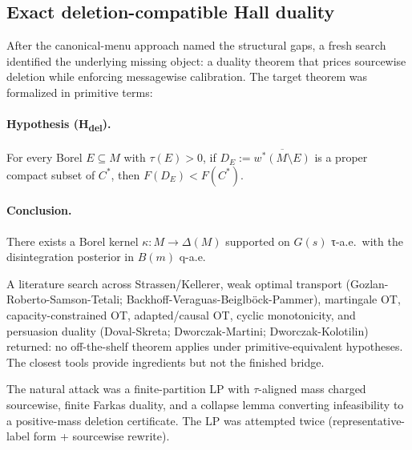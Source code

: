 \documentclass[11pt]{article}
\theoremstyle{definition}
\theoremstyle{remark}
\begin{document}
\subsection{Exact deletion-compatible Hall duality}\label{sec:exact}

After the canonical-menu approach named the structural gaps, a
fresh search identified the underlying missing object: a duality
theorem that prices sourcewise deletion while enforcing messagewise
calibration. The target theorem was formalized in primitive terms:

\paragraph{Hypothesis (H\textsubscript{del}).} For every Borel
$E\subseteq M$ with $\tau(E)>0$, if $D_E := \overline{w^*(M\setminus E)}$
is a proper compact subset of $C^*$, then $F(D_E) < F(C^*)$.

\paragraph{Conclusion.} There exists a Borel kernel $\kappa: M\to\Delta(M)$
supported on $G(s)$ τ-a.e.\ with the disintegration posterior in
$B(m)$ q-a.e.

A literature search across Strassen/Kellerer, weak optimal
transport (Gozlan-Roberto-Samson-Tetali; Backhoff-Veraguas-Beigl\-böck-Pammer),
martingale OT, capacity-constrained OT, adapted/causal OT, cyclic
monotonicity, and persuasion duality (Doval-Skreta;
Dworczak-Martini; Dworczak-Kolotilin) returned: no off-the-shelf
theorem applies under primitive-equivalent hypotheses. The closest
tools provide ingredients but not the finished bridge.

The natural attack was a finite-partition LP with $\tau$-aligned
mass charged sourcewise, finite Farkas duality, and a collapse
lemma converting infeasibility to a positive-mass deletion
certificate. The LP was attempted twice (representative-label form
+ sourcewise rewrite).
\end{document}
